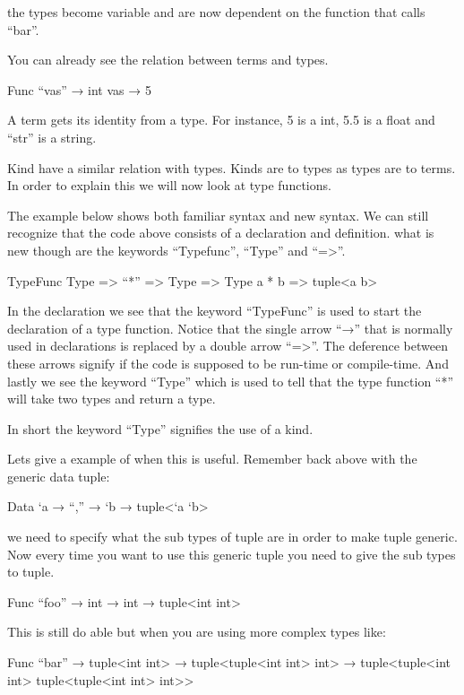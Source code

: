 the types become variable and are now dependent on the function that calls “bar”.

You can already see the relation between terms and types.

\begin{code}
	Func “vas” → int
	vas → 5
\end{code}

A term gets its identity from a type. For instance, 5 is a int, 5.5 is a float and “str” is a string.

Kind have a similar relation with types. Kinds are to types as types are to terms. 
In order to explain this we will now look at type functions.

The example below shows both familiar syntax and new syntax. 
We can still recognize that the code above consists of a declaration and definition. 
what is new though are the keywords “Typefunc”, “Type” and “=>”.

\begin{code}
	TypeFunc Type => “*” => Type => Type
	a * b => tuple<a b>
\end{code}

In the declaration we see that the keyword “TypeFunc” is used to start the declaration of a type function. Notice that the single arrow “→” that is normally used in declarations is replaced by a double arrow “=>”. The deference between these arrows signify if the code is supposed to be run-time or compile-time. And lastly we see the keyword “Type” which is used to tell that the type function “*” will take two types and return a type.

In short the keyword “Type” signifies the use of a kind.

Lets give a example of when this is useful. Remember back above with the generic data tuple:

\begin{code}
	Data `a → “,” → `b → tuple<`a `b>
\end{code}

we need to specify what the sub types of tuple are in order to make tuple generic. Now every time you want to use this generic tuple you need to give the sub types to tuple.

\begin{code}
	Func “foo” → int → int → tuple<int int>
\end{code}

This is still do able but when you are using more complex types like:

\begin{code}
	Func “bar” → tuple<int int> → tuple<tuple<int int> int> → tuple<tuple<int int> tuple<tuple<int int> int>>
\end{code}


